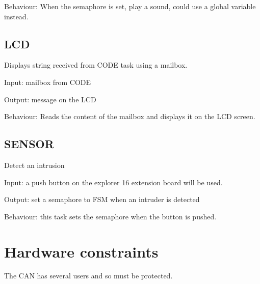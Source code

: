 \documentclass[10pt,a4paper]{article}
\theoremstyle{definition}%
\begin{document}
Behaviour: When the semaphore is set, play a sound, could use a global variable instead.
\subsection{LCD}
Displays string received from CODE task using a mailbox.

Input: mailbox from CODE

Output: message on the LCD

Behaviour: Reads the content of the mailbox and displays it on the LCD screen.
\subsection{SENSOR}
Detect an intrusion

Input: a push button on the explorer 16 extension board will be used.

Output: set a semaphore to FSM when an intruder is detected

Behaviour: this task sets the semaphore when the button is pushed.

\section{Hardware constraints}
The CAN has several users and so must be protected.
\end{document}
